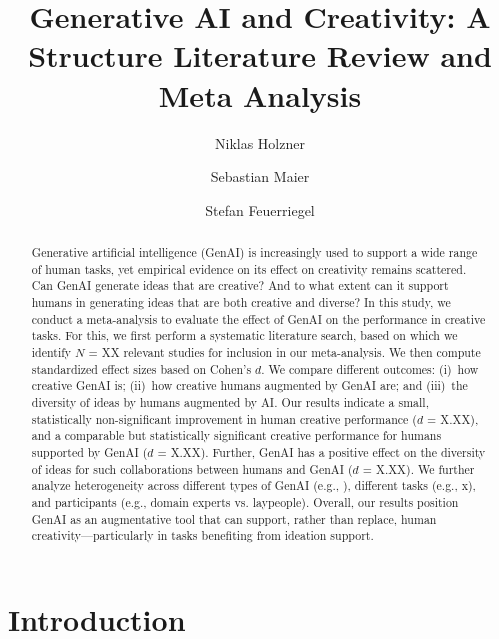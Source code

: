 \documentclass[acmsmall,authorversion]{acmart}
\begin{document}
\title{Generative AI and Creativity: A Structure Literature Review and Meta Analysis}

\author{Niklas Holzner}
\author{Sebastian Maier}
\author{Stefan Feuerriegel}
\begin{abstract}
Generative artificial intelligence (GenAI) is increasingly used to support a wide range of human tasks, yet empirical evidence on its effect on creativity remains scattered. Can GenAI generate ideas that are creative? And to what extent can it support humans in generating ideas that are both creative and diverse? In this study, we conduct a meta-analysis to evaluate the effect of GenAI on the performance in creative tasks. For this, we first perform a systematic literature search, based on which we identify $N$ = XX relevant studies for inclusion in our meta-analysis. We then compute standardized effect sizes based on Cohen’s $d$. We compare different outcomes: (i)~how creative GenAI is; (ii)~how creative humans augmented by GenAI are; and (iii)~the diversity of ideas by humans augmented by AI. Our results indicate a small, statistically non-significant improvement in human creative performance ($d$ = X.XX), and a comparable but statistically significant creative performance for humans supported by GenAI ($d$ = X.XX). Further, GenAI has a positive effect on the diversity of ideas for such collaborations between humans and GenAI ($d$ = X.XX). We further analyze heterogeneity across different types of GenAI (e.g., ), different tasks (e.g., x), and participants (e.g., domain experts vs. laypeople). Overall, our results position GenAI as an augmentative tool that can support, rather than replace, human creativity---particularly in tasks benefiting from ideation support.
\end{abstract}

\maketitle
\section{Introduction}
\label{sec:Introduction}
\end{document}
